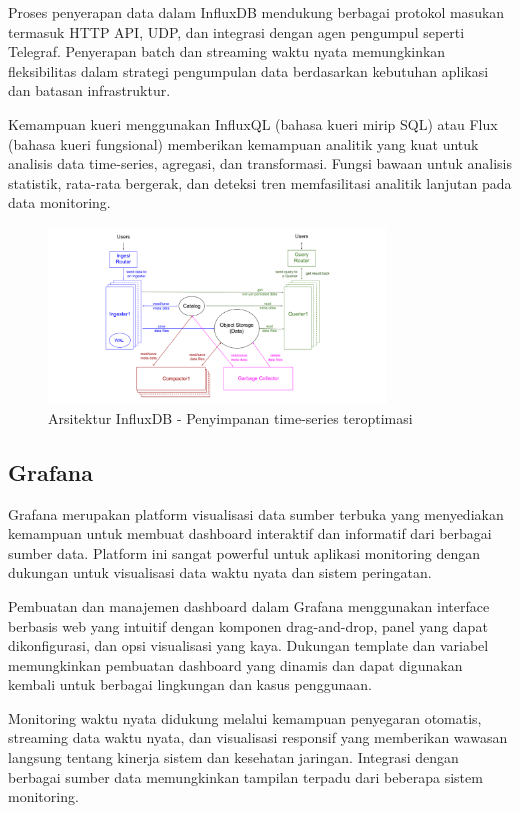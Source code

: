 Proses penyerapan data dalam InfluxDB mendukung berbagai protokol masukan termasuk HTTP API, UDP, dan integrasi dengan agen pengumpul seperti Telegraf. Penyerapan batch dan streaming waktu nyata memungkinkan fleksibilitas dalam strategi pengumpulan data berdasarkan kebutuhan aplikasi dan batasan infrastruktur.

Kemampuan kueri menggunakan InfluxQL (bahasa kueri mirip SQL) atau Flux (bahasa kueri fungsional) memberikan kemampuan analitik yang kuat untuk analisis data time-series, agregasi, dan transformasi. Fungsi bawaan untuk analisis statistik, rata-rata bergerak, dan deteksi tren memfasilitasi analitik lanjutan pada data monitoring.

\begin{figure}[htbp]
    \centering
    \includegraphics[width=0.8\textwidth]{assets/pics/bab3_19.png}
    \caption{Arsitektur InfluxDB - Penyimpanan time-series teroptimasi}
    \label{fig:influxdb_architecture}
\end{figure}

\subsection{Grafana}

Grafana merupakan platform visualisasi data sumber terbuka yang menyediakan kemampuan untuk membuat dashboard interaktif dan informatif dari berbagai sumber data. Platform ini sangat powerful untuk aplikasi monitoring dengan dukungan untuk visualisasi data waktu nyata dan sistem peringatan.

Pembuatan dan manajemen dashboard dalam Grafana menggunakan interface berbasis web yang intuitif dengan komponen drag-and-drop, panel yang dapat dikonfigurasi, dan opsi visualisasi yang kaya. Dukungan template dan variabel memungkinkan pembuatan dashboard yang dinamis dan dapat digunakan kembali untuk berbagai lingkungan dan kasus penggunaan.

Monitoring waktu nyata didukung melalui kemampuan penyegaran otomatis, streaming data waktu nyata, dan visualisasi responsif yang memberikan wawasan langsung tentang kinerja sistem dan kesehatan jaringan. Integrasi dengan berbagai sumber data memungkinkan tampilan terpadu dari beberapa sistem monitoring.


